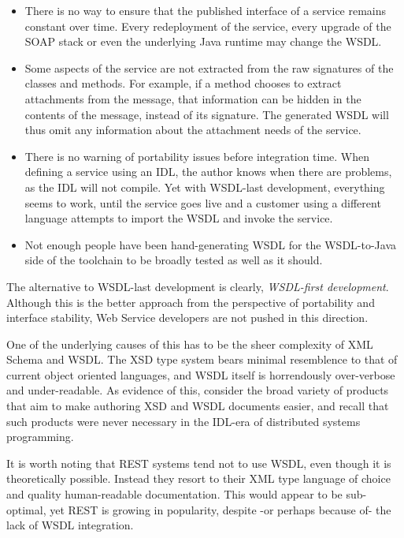 \begin{itemize}

\item
    There is no way to ensure that the published interface of a service
    remains constant over time. Every redeployment of the service, every
    upgrade of the SOAP stack or even the underlying Java runtime may
    change the WSDL.

\item

Some aspects of the service are not extracted from the raw signatures
of the classes and methods. For example, if a method chooses to extract
attachments from the message, that information can be hidden in the contents
of the message, instead of its signature. The generated WSDL will thus
omit any information about the attachment needs of the service.

\item

There is no warning of portability issues before integration time. 
When defining a service using an IDL, the author knows
when there are problems, as the IDL will not compile. Yet with WSDL-last
development, everything seems to work, until the service goes live and
a customer using a different language attempts to import the WSDL and
invoke the service.

\item

Not enough people have been hand-generating WSDL for the WSDL-to-Java
side of the toolchain to be broadly tested as well as it should.

    
\end{itemize}

The alternative to WSDL-last development is clearly, \emph{WSDL-first
development}. Although this is the better approach from the perspective
of portability and interface stability, Web Service developers are not
pushed in this direction.

One of the underlying causes of this has to be the sheer complexity of
XML Schema and WSDL. The XSD type system bears minimal resemblence to
that of current object oriented languages, and WSDL itself is
horrendously over-verbose and under-readable. As evidence of this, 
consider the broad variety of products that aim to make authoring XSD
and WSDL documents easier, and recall that such products were never
necessary in the IDL-era of distributed systems programming.

It is worth noting that REST systems \cite{fielding:rest} tend not to
use WSDL, even though it is theoretically possible. Instead they resort
to their XML type language of choice and quality human-readable
documentation. This would appear to be sub-optimal, yet REST is growing
in popularity, despite -or perhaps because of- the lack of WSDL
integration. 

